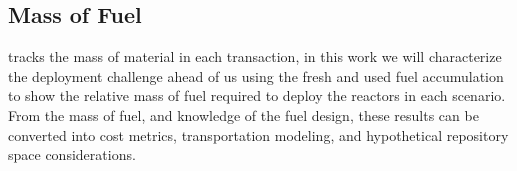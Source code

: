 \subsection{Mass of Fuel}
\label{sec:mass_of_fuel}

\cyclus tracks the mass of material in each transaction, in this work we will characterize the deployment challenge ahead of us using the fresh and used fuel accumulation to show the relative mass of fuel required to deploy the reactors in each scenario. From the mass of fuel, and knowledge of the fuel design, these results can be converted into cost metrics, transportation modeling, and hypothetical repository space considerations. 